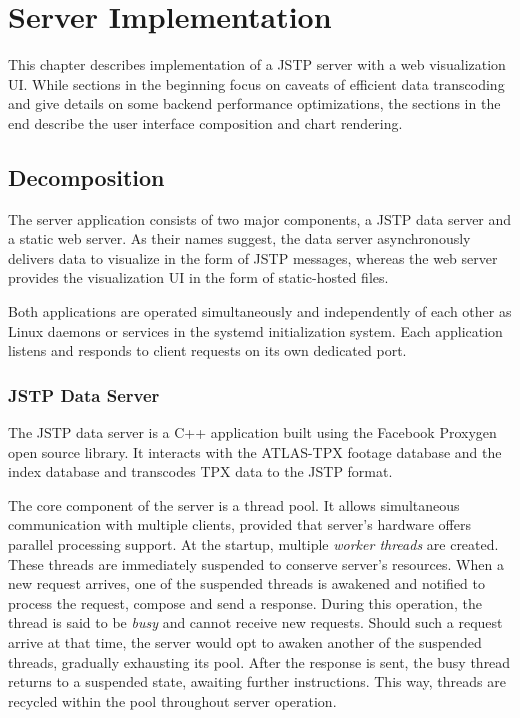 \chapter{Server Implementation}
This chapter describes implementation of a JSTP server with a web visualization UI. While sections in the beginning focus on caveats of efficient data transcoding and give details on some backend performance optimizations, the sections in the end describe the user interface composition and chart rendering.

\section{Decomposition}
The server application consists of two major components, a JSTP data server and a static web server. As their names suggest, the data server asynchronously delivers data to visualize in the form of JSTP messages, whereas the web server provides the visualization UI in the form of static-hosted files.

Both applications are operated simultaneously and independently of each other as Linux daemons or services in the systemd initialization system. Each application listens and responds to client requests on its own dedicated port.

\subsection{JSTP Data Server}
The JSTP data server is a C++ application built using the Facebook Proxygen open source library. It interacts with the ATLAS-TPX footage database and the index database and transcodes TPX data to the JSTP format.

The core component of the server is a thread pool. It allows simultaneous communication with multiple clients, provided that server's hardware offers parallel processing support. At the startup, multiple \textit{worker threads} are created. These threads are immediately suspended to conserve server's resources. When a new request arrives, one of the suspended threads is awakened and notified to process the request, compose and send a response. During this operation, the thread is said to be \textit{busy} and cannot receive new requests. Should such a request arrive at that time, the server would opt to awaken another of the suspended threads, gradually exhausting its pool. After the response is sent, the busy thread returns to a suspended state, awaiting further instructions. This way, threads are recycled within the pool throughout server operation.

